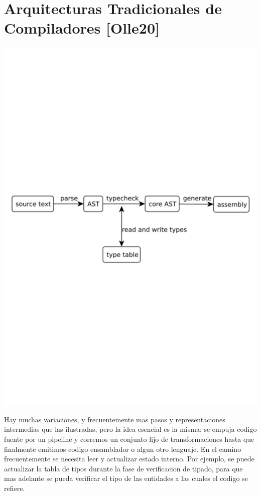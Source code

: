 \section*{Arquitecturas Tradicionales de Compiladores [Olle20]}

\noindent
\includegraphics[width=\textwidth]{olle_trad_comp_arq}
\cite{olle_query_based}

Hay muchas variaciones, y frecuentemente mas pasos y representaciones
intermedias que las ilustradas, pero la idea esencial es la misma: se empuja
codigo fuente por un pipeline y corremos un conjunto fijo de transformaciones
hasta que finalmente emitimos codigo ensamblador o algun otro lenguaje. En el
camino frecuentemente se necesita leer y actualizar estado interno. Por ejemplo,
se puede actualizar la tabla de tipos durante la fase de verificacion de tipado,
para que mas adelante se pueda verificar el tipo de las entidades a las cuales
el codigo se refiere. \cite{olle_query_based}

